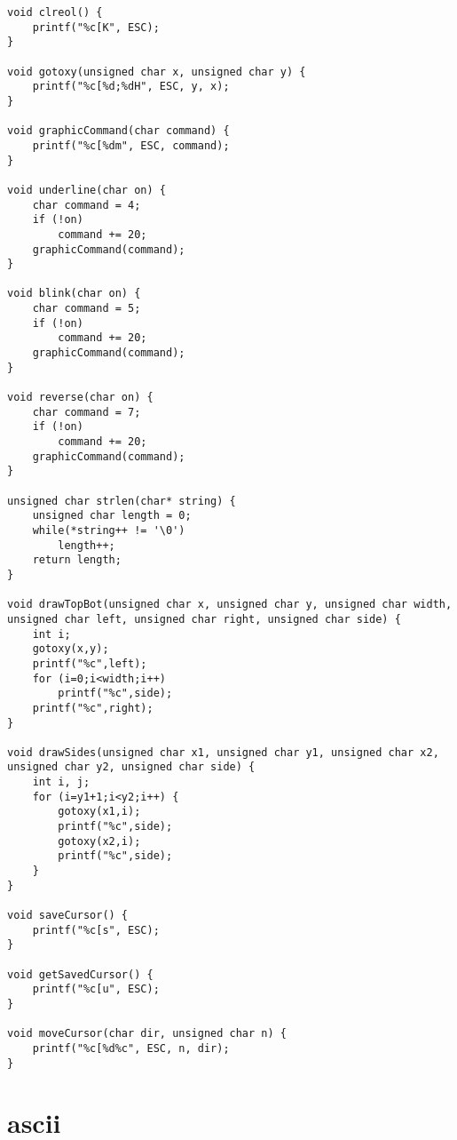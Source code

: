 \begin{lstlisting}
void clreol() {
	printf("%c[K", ESC);	
}

void gotoxy(unsigned char x, unsigned char y) {
	printf("%c[%d;%dH", ESC, y, x);
}

void graphicCommand(char command) {
	printf("%c[%dm", ESC, command);
}

void underline(char on) {
	char command = 4;
	if (!on)
		command += 20;
	graphicCommand(command);
}

void blink(char on) {
	char command = 5;
	if (!on)
		command += 20;
	graphicCommand(command);	
}

void reverse(char on) {
	char command = 7;
	if (!on)
		command += 20;
	graphicCommand(command);
}

unsigned char strlen(char* string) {
	unsigned char length = 0;
	while(*string++ != '\0')
		length++;
	return length;
}

void drawTopBot(unsigned char x, unsigned char y, unsigned char width, unsigned char left, unsigned char right, unsigned char side) {
	int i;
	gotoxy(x,y);
	printf("%c",left);
	for (i=0;i<width;i++)
		printf("%c",side);
	printf("%c",right);
}

void drawSides(unsigned char x1, unsigned char y1, unsigned char x2, unsigned char y2, unsigned char side) {
	int i, j;
	for (i=y1+1;i<y2;i++) {
		gotoxy(x1,i);
		printf("%c",side);
		gotoxy(x2,i);
		printf("%c",side);
	}
}

void saveCursor() {
	printf("%c[s", ESC);
}

void getSavedCursor() {
	printf("%c[u", ESC);
}

void moveCursor(char dir, unsigned char n) {
	printf("%c[%d%c", ESC, n, dir);
}
\end{lstlisting}
\newpage

\section{ascii}
\label{ascii}


